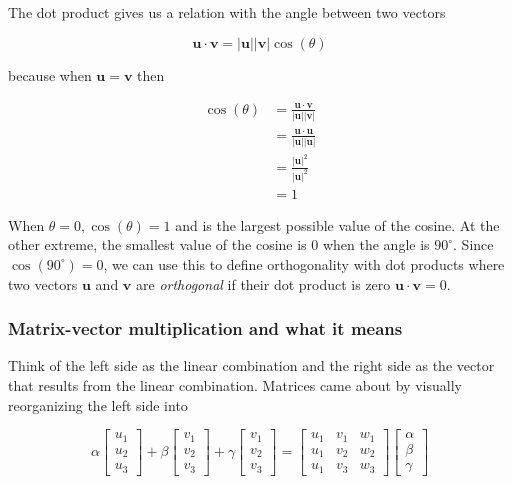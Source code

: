 \documentclass[main.tex]{subfiles}
\begin{document}
    The dot product gives us a relation with the angle between two vectors
    
    $$\mathbf{u} \cdot \mathbf{v}=|\mathbf{u}||\mathbf{v}| \cos (\theta)$$
    
    because when $\mathbf{u}=\mathbf{v}$ then 
    
    $$ \begin{aligned} \cos (\theta) &=\frac{\mathbf{u} \cdot \mathbf{v}}{|\mathbf{u}||\mathbf{v}|} \\
    &=\frac{\mathbf{u} \cdot \mathbf{u}}{|\mathbf{u}||\mathbf{u}|} \\
    &=\frac{|\mathbf{u}|^{2}}{|\mathbf{u}|^{2}} \\
    &=1
    \end{aligned}$$
    
    When $\theta=0, \cos (\theta)=1$ and is the largest possible value of the cosine. At the other extreme, the smallest value of the cosine is $0$ when the angle is $90^\circ$. Since $\cos \left(90^{\circ}\right)=0$, we can use this to define orthogonality with dot products where two vectors $\mathbf{u}$ and $\mathbf{v}$ are \textit{orthogonal} if their dot product is zero $\mathbf{u} \cdot \mathbf{v}=0$.
    
    \subsubsection{Matrix-vector multiplication and what it means}
    
    Think of the left side as the linear combination and the right side as the vector that results from the linear combination. Matrices came about by visually reorganizing the left side into 
    
    $$\alpha\left[\begin{array}{l}u_{1} \\ u_{2} \\ u_{3}\end{array}\right]+\beta\left[\begin{array}{l}v_{1} \\ v_{2} \\ v_{3}\end{array}\right]+\gamma\left[\begin{array}{l}v_{1} \\ v_{2} \\ v_{3}\end{array}\right]=\left[\begin{array}{lll}u_{1} & v_{1} & w_{1} \\ u_{1} & v_{2} & w_{2} \\ u_{1} & v_{3} & w_{3}\end{array}\right]\left[\begin{array}{l}\alpha \\ \beta \\ \gamma\end{array}\right]$$
    
\end{document}

